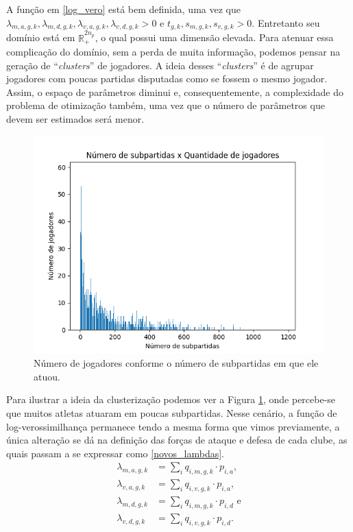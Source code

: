 A função em \ref{log_vero} está bem definida, uma vez que $\lambda_{m, a, g, k}, \lambda_{m, d, g, k}, \lambda_{v, a, g, k}, \lambda_{v, d, g, k} > 0$ e $t_{g, k}, s_{m, g, k}, s_{v, g, k} > 0$. Entretanto seu domínio está em $\mathds{R}_+^{2n_p}$, o qual possui uma dimensão elevada. Para atenuar essa complicação do domínio, sem a perda de muita informação, podemos pensar na geração de ``\textit{clusters}'' de jogadores. A ideia desses ``\textit{clusters}'' é de agrupar jogadores com poucas partidas disputadas como se fossem o mesmo jogador. Assim, o espaço de parâmetros diminui e, consequentemente, a complexidade do problema de otimização também, uma vez que o número de parâmetros que devem ser estimados será menor.
\begin{figure}[H]
    \centering
    \includegraphics[scale = 0.8]{images/games_played_per_player.png}
    \caption{Número de jogadores conforme o número de subpartidas em que ele atuou.}
    \label{games_played}
\end{figure}

Para ilustrar a ideia da clusterização podemos ver a Figura \ref{games_played}, onde percebe-se que muitos atletas atuaram em poucas subpartidas. Nesse cenário, a função de log-verossimilhança permanece tendo a mesma forma que vimos previamente, a única alteração se dá na definição das forças de ataque e defesa de cada clube, as quais passam a se expressar como \ref{novos_lambdas}.
\begin{equation}
    \begin{split}
        \lambda_{m, a, g, k} & = \sum_{i} q_{i, m, g, k}\cdot p_{i, a}, \\
        \lambda_{v, a, g, k} & = \sum_{i} q_{i, v, g, k}\cdot p_{i, a}, \\
        \lambda_{m, d, g, k} & = \sum_{i} q_{i, m, g, k}\cdot p_{i, d} \text{ e} \\
        \lambda_{v, d, g, k} & = \sum_{i} q_{i, v, g, k}\cdot p_{i, d}.
    \end{split}
    \label{novos_lambdas}
\end{equation}

